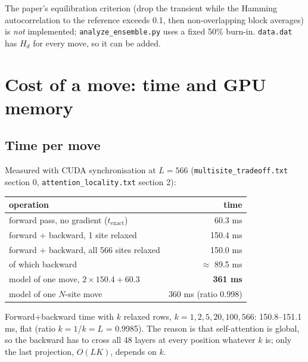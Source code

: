\documentclass[11pt,a4paper]{article}
\newcommand{\Hd}{H_d}
\newcommand{\file}[1]{\texttt{#1}}
\begin{document}
The paper's equilibration criterion (drop the transient while the Hamming
autocorrelation to the reference exceeds 0.1, then non-overlapping block
averages) is \emph{not} implemented; \file{analyze\_ensemble.py} uses a fixed
50\% burn-in. \file{data.dat} has $\Hd$ for every move, so it can be added.

\section{Cost of a move: time and GPU memory}\label{sec:cost}
\subsection{Time per move}
Measured with CUDA synchronisation at $L=566$
(\file{multisite\_tradeoff.txt} section 0, \file{attention\_locality.txt}
section 2):
\begin{center}
\begin{tabular}{@{}lr@{}}
\toprule
operation & time \\
\midrule
forward pass, no gradient ($t_{\mathrm{exact}}$)   & 60.3 ms \\
forward + backward, 1 site relaxed                 & 150.4 ms \\
forward + backward, all 566 sites relaxed          & 150.0 ms \\
\quad of which backward                            & $\approx$ 89.5 ms \\
\midrule
model of one move, $2\times150.4 + 60.3$           & \textbf{361 ms} \\
model of one $N$-site move                         & 360 ms (ratio 0.998) \\
\bottomrule
\end{tabular}
\end{center}
Forward+backward time with $k$ relaxed rows, $k=1,2,5,20,100,566$:
150.8--151.1\,ms, flat (ratio $k{=}1$/$k{=}L$ = 0.9985). The reason is that
self-attention is global, so the backward has to cross all 48 layers at every
position whatever $k$ is; only the last projection, $O(LK)$, depends on $k$.
\end{document}
